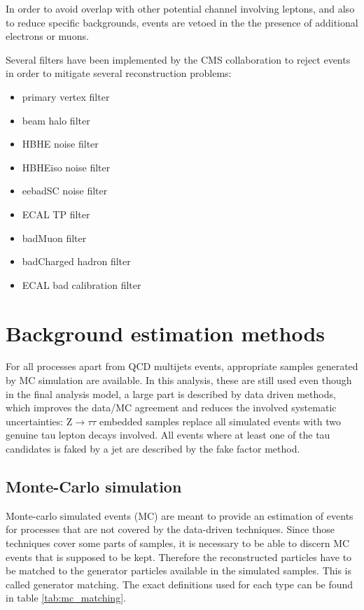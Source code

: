 In order to avoid overlap with other potential channel involving leptons, and also to reduce specific backgrounds, events are vetoed in the the presence of additional electrons or muons.

Several filters have been implemented by the CMS collaboration to reject events in order to mitigate several \met reconstruction problems:
\begin{itemize}
    \item primary vertex filter
    \item beam halo filter
    \item HBHE noise filter
    \item HBHEiso noise filter
    \item eebadSC noise filter
    \item ECAL TP filter
    \item badMuon filter
    \item badCharged hadron filter
    \item ECAL bad calibration filter
\end{itemize}

\section{Background estimation methods}
\label{sec:analysis_background_methods}

For all processes apart from QCD multijets events, appropriate samples generated by MC simulation are available. In this analysis, these are still used even though in the final analysis model, a large part is described by data driven methods, which improves the data/MC agreement and reduces the involved systematic uncertainties: $\mathrm{Z} \rightarrow \tau\tau$ embedded samples replace all simulated events with two genuine tau lepton decays involved. All events where at least one of the tau candidates is faked by a jet are described by the fake factor method.

\subsection{Monte-Carlo simulation}

Monte-carlo simulated events (MC) are meant to provide an estimation of events for processes that are not covered by the data-driven techniques. Since those techniques cover some parts of samples, it is necessary to be able to discern MC events that is supposed to be kept. Therefore the reconstructed particles have to be matched to the generator particles available in the simulated samples. This is called generator matching. The exact definitions used for each type can be found in table \ref{tab:mc_matching}.

